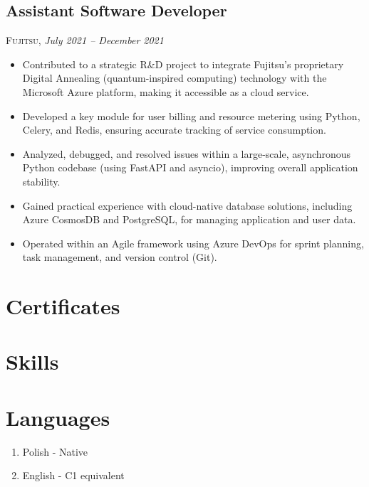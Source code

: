\documentclass[a4paper, 12pt]{article} %
\begin{document}
\subsection{Assistant Software Developer}
\textsc{Fujitsu}, \textit{July 2021 – December 2021}
\begin{itemize}
    \itemsep -0.3em %
    \item Contributed to a strategic R\&D project to integrate Fujitsu's proprietary Digital Annealing (quantum-inspired computing) technology with the Microsoft Azure platform, making it accessible as a cloud service.
    \item Developed a key module for user billing and resource metering using Python, Celery, and Redis, ensuring accurate tracking of service consumption.
    \item Analyzed, debugged, and resolved issues within a large-scale, asynchronous Python codebase (using FastAPI and asyncio), improving overall application stability.
    \item Gained practical experience with cloud-native database solutions, including Azure CosmosDB and PostgreSQL, for managing application and user data.
    \item Operated within an Agile framework using Azure DevOps for sprint planning, task management, and version control (Git).
\end{itemize}

\section{Certificates}
\lipsum

\section{Skills}
\lipsum

\section{Languages}
\begin{enumerate} %
    \item Polish - Native
    \item English - C1 equivalent
\end{enumerate}
\end{document}
